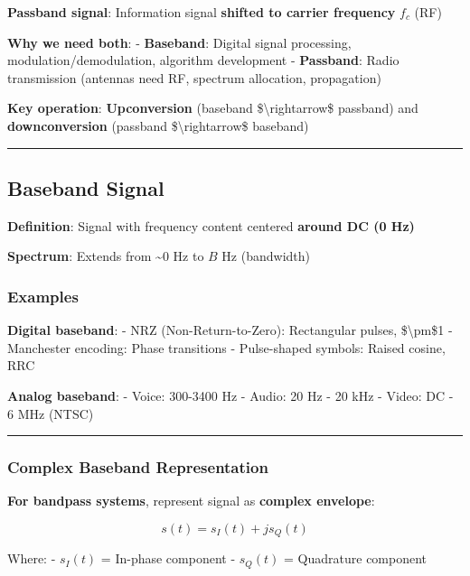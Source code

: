 \textbf{Passband signal}: Information signal \textbf{shifted to carrier
frequency} \(f_c\) (RF)

\textbf{Why we need both}: - \textbf{Baseband}: Digital signal
processing, modulation/demodulation, algorithm development -
\textbf{Passband}: Radio transmission (antennas need RF, spectrum
allocation, propagation)

\textbf{Key operation}: \textbf{Upconversion} (baseband
\$\textbackslash rightarrow\$ passband) and \textbf{downconversion}
(passband \$\textbackslash rightarrow\$ baseband)

\begin{center}\rule{0.5\linewidth}{0.5pt}\end{center}

\subsection{Baseband Signal}\label{baseband-signal}

\textbf{Definition}: Signal with frequency content centered
\textbf{around DC (0 Hz)}

\textbf{Spectrum}: Extends from \textasciitilde0 Hz to \(B\) Hz
(bandwidth)

\subsubsection{Examples}\label{examples}

\textbf{Digital baseband}: - NRZ (Non-Return-to-Zero): Rectangular
pulses, \$\textbackslash pm\$1 - Manchester encoding: Phase transitions
- Pulse-shaped symbols: Raised cosine, RRC

\textbf{Analog baseband}: - Voice: 300-3400 Hz - Audio: 20 Hz - 20 kHz -
Video: DC - 6 MHz (NTSC)

\begin{center}\rule{0.5\linewidth}{0.5pt}\end{center}

\subsubsection{Complex Baseband
Representation}\label{complex-baseband-representation}

\textbf{For bandpass systems}, represent signal as \textbf{complex
envelope}:

\[
s(t) = s_I(t) + j s_Q(t)
\]

Where: - \(s_I(t)\) = In-phase component - \(s_Q(t)\) = Quadrature
component


